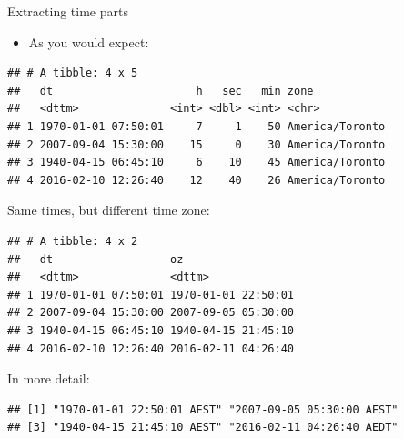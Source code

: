 \documentclass[ignorenonframetext,]{beamer}
\newenvironment{Shaded}{\begin{snugshade}}{\end{snugshade}}
\newcommand{\DataTypeTok}[1]{\textcolor[rgb]{0.13,0.29,0.53}{#1}}
\newcommand{\KeywordTok}[1]{\textcolor[rgb]{0.13,0.29,0.53}{\textbf{#1}}}
\newcommand{\NormalTok}[1]{#1}
\newcommand{\OperatorTok}[1]{\textcolor[rgb]{0.81,0.36,0.00}{\textbf{#1}}}
\newcommand{\StringTok}[1]{\textcolor[rgb]{0.31,0.60,0.02}{#1}}
\providecommand{\tightlist}{%
  \setlength{\itemsep}{0pt}\setlength{\parskip}{0pt}}
\begin{document}
\begin{frame}[fragile]{Extracting time parts}
\protect\hypertarget{extracting-time-parts}{}

\begin{itemize}
\tightlist
\item
  As you would expect:
\end{itemize}

\begin{Shaded}
\end{Shaded}

\begin{verbatim}
## # A tibble: 4 x 5
##   dt                      h   sec   min zone           
##   <dttm>              <int> <dbl> <int> <chr>          
## 1 1970-01-01 07:50:01     7     1    50 America/Toronto
## 2 2007-09-04 15:30:00    15     0    30 America/Toronto
## 3 1940-04-15 06:45:10     6    10    45 America/Toronto
## 4 2016-02-10 12:26:40    12    40    26 America/Toronto
\end{verbatim}

\end{frame}

\begin{frame}[fragile]{Same times, but different time zone:}
\protect\hypertarget{same-times-but-different-time-zone}{}

\begin{Shaded}
\end{Shaded}

\begin{verbatim}
## # A tibble: 4 x 2
##   dt                  oz                 
##   <dttm>              <dttm>             
## 1 1970-01-01 07:50:01 1970-01-01 22:50:01
## 2 2007-09-04 15:30:00 2007-09-05 05:30:00
## 3 1940-04-15 06:45:10 1940-04-15 21:45:10
## 4 2016-02-10 12:26:40 2016-02-11 04:26:40
\end{verbatim}

In more detail:

\begin{verbatim}
## [1] "1970-01-01 22:50:01 AEST" "2007-09-05 05:30:00 AEST"
## [3] "1940-04-15 21:45:10 AEST" "2016-02-11 04:26:40 AEDT"
\end{verbatim}

\end{frame}
\end{document}
